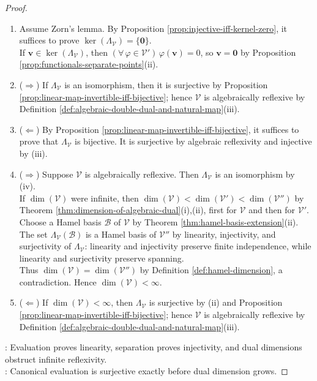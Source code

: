 \begin{theorem}
\begin{proof}
\begin{enumerate}[label=(\roman*)]
Therefore $\Lambda_{\mathcal{V}}$ is surjective by Corollary \ref{cor:equal-dimension-kernel-range}(ii) and is an isomorphism by Proposition \ref{prop:linear-map-invertible-iff-bijective}.
\item[$(iii)$] Assume Zorn's lemma. By Proposition \ref{prop:injective-iff-kernel-zero}, it suffices to prove $\ker(\Lambda_{\mathcal{V}})=\{\mathbf{0}\}$.\\
If $\mathbf{v}\in\ker(\Lambda_{\mathcal{V}})$, then $(\forall\,\varphi\in\mathcal{V}')\,\varphi(\mathbf{v})=0$, so $\mathbf{v}=\mathbf{0}$ by Proposition \ref{prop:functionals-separate-points}(ii).
\item[$(iv)$] ($\Rightarrow$) If $\Lambda_{\mathcal{V}}$ is an isomorphism, then it is surjective by Proposition \ref{prop:linear-map-invertible-iff-bijective}; hence $\mathcal{V}$ is algebraically reflexive by Definition \ref{def:algebraic-double-dual-and-natural-map}(iii).
\item[$(iv)$] ($\Leftarrow$) By Proposition \ref{prop:linear-map-invertible-iff-bijective}, it suffices to prove that $\Lambda_{\mathcal{V}}$ is bijective. It is surjective by algebraic reflexivity and injective by (iii).
\item[$(v)$] ($\Rightarrow$) Suppose $\mathcal{V}$ is algebraically reflexive. Then $\Lambda_{\mathcal{V}}$ is an isomorphism by (iv).\\
If $\dim(\mathcal{V})$ were infinite, then $\dim(\mathcal{V})<\dim(\mathcal{V}')<\dim(\mathcal{V}'')$ by Theorem \ref{thm:dimension-of-algebraic-dual}(i),(ii), first for $\mathcal{V}$ and then for $\mathcal{V}'$.\\
Choose a Hamel basis $\mathcal{B}$ of $\mathcal{V}$ by Theorem \ref{thm:hamel-basis-extension}(ii). The set $\Lambda_{\mathcal{V}}(\mathcal{B})$ is a Hamel basis of $\mathcal{V}''$ by linearity, injectivity, and surjectivity of $\Lambda_{\mathcal{V}}$: linearity and injectivity preserve finite independence, while linearity and surjectivity preserve spanning.\\
Thus $\dim(\mathcal{V})=\dim(\mathcal{V}'')$ by Definition \ref{def:hamel-dimension}, a contradiction. Hence $\dim(\mathcal{V})<\infty$.
\item[$(v)$] ($\Leftarrow$) If $\dim(\mathcal{V})<\infty$, then $\Lambda_{\mathcal{V}}$ is surjective by (ii) and Proposition \ref{prop:linear-map-invertible-iff-bijective}; hence $\mathcal{V}$ is algebraically reflexive by Definition \ref{def:algebraic-double-dual-and-natural-map}(iii).
\end{enumerate}
: Evaluation proves linearity, separation proves injectivity, and dual dimensions obstruct infinite reflexivity.\\
: Canonical evaluation is surjective exactly before dual dimension grows.
\end{proof}
\end{theorem}

